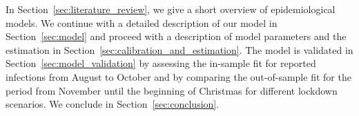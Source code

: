 In Section~\ref{sec:literature_review}, we give a short overview of epidemiological
models. We continue with a detailed description of our model in Section~\ref{sec:model}
and proceed with a description of model parameters and the estimation in
Section~\ref{sec:calibration_and_estimation}. The model is validated in
Section~\ref{sec:model_validation} by assessing the in-sample fit for reported
infections from August to October and by comparing the out-of-sample fit for the period
from November until the beginning of Christmas for different lockdown scenarios. We
conclude in Section~\ref{sec:conclusion}.
